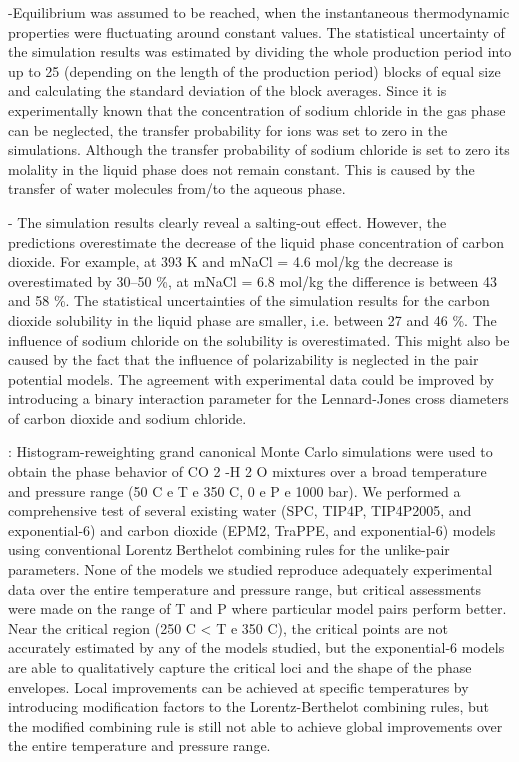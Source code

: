 -Equilibrium was assumed to be reached, when the instantaneous thermodynamic properties were fluctuating around constant values. The statistical uncertainty of the simulation results was estimated by dividing the whole production period into up to 25 (depending on the length of the production period) blocks of equal size and calculating the standard deviation of the block averages. Since it is experimentally known that the concentration of sodium chloride in the gas phase can be neglected, the transfer probability for ions was set to zero in the simulations. Although the transfer probability of sodium chloride is set to zero its molality in the liquid phase does not remain constant. This is caused by the transfer of water molecules from/to the aqueous phase.

- The simulation results clearly reveal a salting-out effect. However, the predictions overestimate the decrease of the liquid phase concentration of carbon dioxide. For example, at 393 K and mNaCl = 4.6 mol/kg the decrease is overestimated by 30–50 \%, at mNaCl = 6.8 mol/kg the difference is between 43 and 58 \%. The statistical uncertainties of the simulation results for the carbon dioxide solubility in the liquid phase are smaller, i.e. between 27 and 46 \%. The influence of sodium chloride on the solubility is overestimated. This might also be caused by the fact that the influence of polarizability is neglected in the pair potential models. The agreement with experimental data could be improved by introducing a binary interaction parameter for the Lennard-Jones cross diameters of carbon dioxide and sodium chloride.



\cite{Liu2011}: Histogram-reweighting grand canonical Monte Carlo simulations were used to obtain the phase behavior of CO 2 -H 2 O mixtures over a broad temperature and pressure range (50 C e T e 350 C, 0 e P e 1000 bar). We performed a comprehensive test of several existing water (SPC, TIP4P, TIP4P2005, and exponential-6) and carbon dioxide (EPM2, TraPPE, and exponential-6)
models using conventional LorentzBerthelot combining rules for the unlike-pair parameters. None of the models we studied reproduce adequately experimental data over the entire temperature and pressure range, but critical assessments were made on the range of T and P where particular model pairs perform better. Near the critical region (250 C < T e 350 C), the critical points are not accurately estimated by any of the models studied, but the exponential-6 models are able to qualitatively capture the critical loci and the shape of the phase envelopes. Local improvements can be achieved at speciﬁc temperatures by introducing modiﬁcation factors to the Lorentz-Berthelot combining rules, but the modiﬁed combining rule is still not able to achieve global improvements over the entire temperature and pressure range. 

